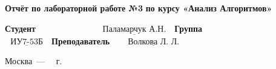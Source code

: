 \begin{titlepage}
	\begin{center}
		\noindent\begin{minipage}{1.3\textwidth}\centering
		\Large\textbf{Отчёт по лабораторной работе №3}\newline
		\textbf{по курсу «Анализ Алгоритмов»}\newline\newline\newline
		\end{minipage}
	\end{center}
	

	\noindent\textbf{Студент~~~~~~~~~~~~} $\underline{\text{~~Паламарчук А.Н.~~}}$\newline\newline
	\noindent\textbf{Группа~~~~~~~~~~~~~} $\underline{\text{~~ИУ7-53Б~~}}$\newline\newline
	\noindent\textbf{Преподаватель~~} $\underline{\text{~~Волкова Л. Л.~~}}$\newline
	
	\begin{center}
		\vfill
		Москва~---~\the\year
		~г.
	\end{center}
	\restoregeometry
\end{titlepage}

